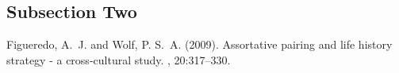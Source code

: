\documentclass[twoside]{article}
\begin{document}
\begin{multicols}{2}
\lipsum[7] %

\subsection{Subsection Two}

\lipsum[8] %


\begin{thebibliography}{99} %

Figueredo, A.~J. and Wolf, P. S.~A. (2009).
\newblock Assortative pairing and life history strategy - a cross-cultural
  study.
, 20:317--330.
 
\end{thebibliography}


\end{multicols}
\end{document}
